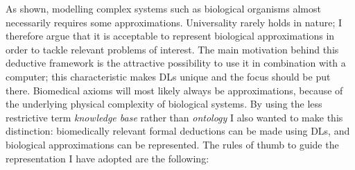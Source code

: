 As shown, modelling complex systems such as biological organisms almost necessarily requires some approximations. Universality rarely holds in nature; I therefore argue that it is acceptable to represent biological approximations in order to tackle relevant problems of interest. The main motivation behind this deductive framework is the attractive possibility to use it in combination with a computer; this characteristic makes DLs unique and the focus should be put there. Biomedical axioms will most likely always be approximations, because of the underlying physical complexity of biological systems. By using the less restrictive term \emph{knowledge base} rather than \emph{ontology} I also wanted to make this distinction: biomedically relevant formal deductions can be made using DLs, and biological approximations can be represented. The rules of thumb to guide the representation I have adopted are the following:

